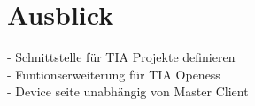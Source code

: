 \chapter{Ausblick}
\label{Ausblick}
	- Schnittstelle für TIA Projekte definieren\\
	- Funtionserweiterung für TIA Openess\\
	- Device seite unabhängig von Master Client\\
	
